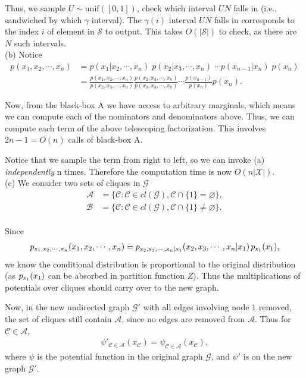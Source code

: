 \documentclass{article}
\newcommand{\s}[1]{\textsf{\textit{#1}}}
\let\emptyset\varnothing
\begin{document}
Thus, we sample $U \sim \text{unif}([0, 1])$, check which interval $UN$ falls in (i.e., sandwiched by which $\gamma$ interval). The $\gamma(i)$ interval $UN$ falls in corresponds to the index $i$ of element in $\mathscr{S}$ to output. This takes $O(|\mathscr{S}|)$ to check, as there are $N$ such intervals.
\\

%
\noindent
(b) Notice
\begin{align*}
p(x_1, x_2, \cdots, x_n) &= p(x_1 | x_2, \cdots, x_n) \; p(x_2 | x_3, \cdots, x_n)\; \cdots
p(x_{n-1}|x_n)\;p(x_n)\\
&= \frac{p(x_1, x_2, \cdots, x_n)}{p(x_2, x_3, \cdots, x_n)}
\frac{p(x_2, x_3, \cdots, x_n)}{p(x_3, x_4, \cdots, x_n)}
\cdots\frac{p(x_{n-1})}{p(x_n)}p(x_n).
\end{align*}

Now, from the black-box A we have access to arbitrary marginals,
which means we can compute each of the nominators and denominators above.
Thus, we can compute each term of the above telescoping factorization.
This involves $2n -1 = O(n)$ calls of black-box A.

Notice that we sample the term from right to left, so we can invoke (a) \emph{independently} n times. Therefore the computation
time is now $O(n|\mathscr{X}|)$.
\\

%
\noindent
(c) We consider two sets of cliques in $\mathscr{G}$
\begin{align*}
\mathcal{A} &= \Big\{\mathscr{C}: \mathscr{C} \in cl(\mathscr{G}), \mathscr{C}\cap\{1\} = \emptyset \Big\},\\
\mathscr{B} &= \Big\{\mathscr{C}: \mathscr{C} \in cl(\mathscr{G}), \mathscr{C}\cap\{1\} \neq \emptyset \Big\}.
\end{align*}
\\
%
Since
\begin{align*}
p_{\s{x}_1, \s{x}_2, \cdots, \s{x}_n}(x_1, x_2, \cdots, x_n) = p_{\s{x}_2, \s{x}_3, \cdots, \s{x}_n | \s{x}_1}(x_2, x_3, \cdots, x_n | x_1) \,p_{\s{x}_1}(x_1),
\end{align*}
we know the conditional distribution is proportional to the original distribution (as $p_{\s{x}_1}(x_1)$ can be absorbed in partition function $Z$). Thus the multiplications of potentials over cliques should carry over to the new graph.

Now, in the new undirected graph $\mathscr{G}'$ with all edges involving node 1 removed, the set of cliques still contain $\mathscr{A}$, since no edges are removed from $\mathscr{A}$. Thus for $\mathscr{C}\in\mathscr{A}$,
\begin{align*}
\psi'_{\mathscr{C}\in\mathscr{A}}(x_{\mathscr{C}}) =
\psi_{\mathscr{C}\in\mathscr{A}}(x_{\mathscr{C}}),	
\end{align*}
where $\psi$ is the potential function in the original graph $\mathscr{G}$, and $\psi'$ is on the new graph $\mathscr{G}'$.
\end{document}
